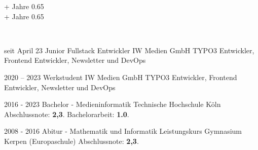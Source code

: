 \begin{paracol}{2}
\begin{leftcolumn}
 {\number\numexpr{}\relax+ Jahre} {0.65} \\[-2pt]

 {\number\numexpr{}\relax+ Jahre} {0.65} \\[-2pt]

\end{leftcolumn}

\begin{rightcolumn}

 \\[14pt]
\vspace{-12pt}


\cveventAccent
	{seit April 23}
	{Junior Fullstack Entwickler}
	{IW Medien GmbH}
	{TYPO3 Entwickler, Frontend Entwickler, Newsletter und DevOps}
	{}
\vfill\null

\cvevent
	{2020 – 2023}
	{Werkstudent}
	{IW Medien GmbH}
	{TYPO3 Entwickler, Frontend Entwickler, Newsletter und DevOps}
	{}
\vfill\null


\cvevent
	{2016 - 2023}
	{Bachelor - Medieninformatik}
	{Technische Hochschule Köln}
	{Abschlussnote: \textbf{2,3}. Bachelorarbeit: \textbf{1.0}.}
	{}
\vfill\null

\cvevent
	{2008 - 2016}
	{Abitur - Mathematik und Informatik Leistungskurs}
	{Gymnasium Kerpen (Europaschule)}
	{Abschlussnote: \textbf{2,3}.}
	{}
\vfill\null

\vfill
\vfill
\vfill
\end{rightcolumn}
\end{paracol}